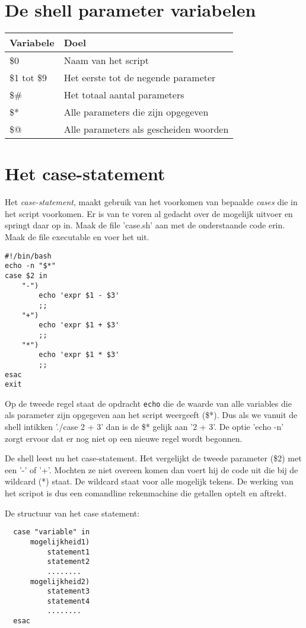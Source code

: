 \section{De shell parameter variabelen}\label{h7.para}
\begin{tabular}[t]{ll}
  Variabele & Doel \\
  \hline
  \$0 & Naam van het script\\
  \$1 tot \$9 & Het eerste tot de negende parameter\\
  \$\# & Het totaal aantal parameters \\
  \$* & Alle parameters die zijn opgegeven \\
  \$@ & Alle parameters als gescheiden woorden \\
\end{tabular}

\section{Het case-statement}
Het \emph{case-statement}, maakt gebruik van het voorkomen van bepaalde \emph{cases} die in het script voorkomen. Er is van te voren al gedacht over de mogelijk uitvoer en springt daar op in. Maak de file 'case.sh' aan met de onderstaande code erin. Maak de file executable en voer het uit.
\begin{lstlisting}
#!/bin/bash
echo -n "$*"
case $2 in
    "-")
        echo 'expr $1 - $3'
        ;;
    "+")
        echo 'expr $1 + $3'
        ;;
    "*")
        echo 'expr $1 * $3'
        ;;
esac
exit
\end{lstlisting}

Op de tweede regel staat de opdracht \texttt{echo} die de waarde van alle variables die als parameter zijn opgegeven aan het script weergeeft (\$*). Dus als we vanuit de shell intikken './case 2 + 3' dan is de \$* gelijk aan '2 + 3'. De optie 'echo -n' zorgt ervoor dat er nog niet op een nieuwe regel wordt begonnen.

De shell leest nu het case-statement. Het vergelijkt de tweede parameter (\$2) met een '-' of '+'. Mochten ze niet overeen komen dan voert hij de code uit die bij de wildcard (*) staat. De wildcard staat voor alle mogelijk tekens. De werking van het scripot is dus een comandline rekenmachine die getallen optelt en aftrekt.

De structuur van het case statement:
\begin{lstlisting}
  case "variable" in
      mogelijkheid1)
          statement1
          statement2
          ........
      mogelijkheid2)
          statement3
          statement4
          ........
  esac
\end{lstlisting}

